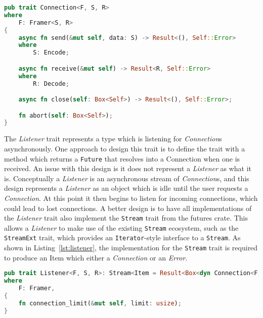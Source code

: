 \begin{lstlisting}[language=Rust, float=h, label=lst:connection, caption={The Connection trait.}]
pub trait Connection<F, S, R>
where
    F: Framer<S, R>
{
    async fn send(&mut self, data: S) -> Result<(), Self::Error>
    where
        S: Encode;

    async fn receive(&mut self) -> Result<R, Self::Error>
    where
        R: Decode;

    async fn close(self: Box<Self>) -> Result<(), Self::Error>;

    fn abort(self: Box<Self>);
}
\end{lstlisting}

The \emph{Listener} trait represents a type which is listening for \emph{Connection}s asynchronously.
One approach to design this trait is to define the trait with a method which returns a \texttt{Future} that resolves
into a Connection when one is received.
An issue with this design is it does not represent a \emph{Listener} as what it is.
Conceptually a \emph{Listener} is an asynchronous stream of \emph{Connection}s, and this design represents a
\emph{Listener} as an object which is idle until the user requests a \emph{Connection}.
At this point it then begins to listen for incoming connections, which could lead to lost connections.
A better design is to have all implementations of the \emph{Listener} trait also implement the \texttt{Stream} trait
from the futures crate.
This allows a \emph{Listener} to make use of the existing \texttt{Stream} ecosystem, such as the \texttt{StreamExt}
trait, which provides an \texttt{Iterator}-style interface to a \texttt{Stream}.
As shown in Listing~\ref{lst:listener}, the implementation for the \texttt{Stream} trait is required to produce an Item
which either a \emph{Connection} or an \emph{Error}.

\begin{lstlisting}[language=Rust, float=h, label=lst:listener, caption={The Listener trait, showing the Stream
    implementation requirement for all implementers.}]
pub trait Listener<F, S, R>: Stream<Item = Result<Box<dyn Connection<F, S, R>>, Error>>
where
    F: Framer,
{
    fn connection_limit(&mut self, limit: usize);
}

\end{lstlisting}

